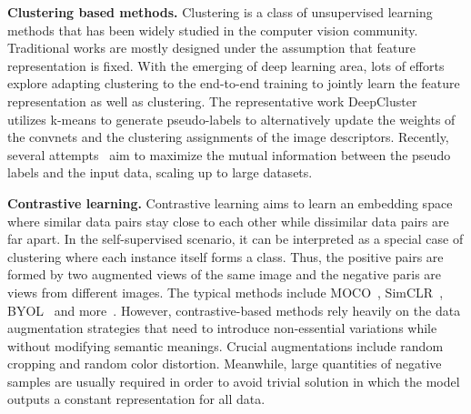 \documentclass[runningheads]{llncs}
\begin{document}
\noindent \textbf{Clustering based methods.}
Clustering is a class of unsupervised learning methods that has been widely studied in the computer vision community. Traditional works are mostly designed under the assumption that feature representation is fixed.
With the emerging of deep learning area, lots of efforts~\cite{yang2016joint,xie2016unsupervised} explore adapting clustering to the end-to-end training to jointly learn the feature representation as well as clustering. The representative work DeepCluster~\cite{caron2018deep} utilizes k-means to generate pseudo-labels to alternatively update the weights of the convnets and the clustering assignments of the image descriptors. Recently, several attempts~\cite{asano2019self,caron2020swav} aim to maximize the mutual information between the pseudo labels and the input data, scaling up to large datasets.

\noindent \textbf{Contrastive learning.}
Contrastive learning aims to learn an embedding space where similar data pairs stay close to each other while dissimilar data pairs are far apart.
In the self-supervised scenario, 
it can be interpreted as a special case of clustering where each instance itself forms a class. Thus, the positive pairs are formed by two augmented views of the same image and the negative paris are views from different images.
The typical methods include MOCO~\cite{he2020momentum,chen2020improved,chen2021empirical}, SimCLR~\cite{chen2020simple,chen2020big}, BYOL~\cite{grill2020bootstrap} and more~\cite{oord2018representation,li2021improve,bachman2019learning}.
However, contrastive-based methods rely heavily on the data augmentation strategies that need to introduce non-essential variations while without modifying semantic meanings.
Crucial augmentations include random cropping and random color distortion.
Meanwhile, large quantities of negative samples are usually required in order to avoid trivial solution in which the model outputs a constant representation for all data.
\end{document}
